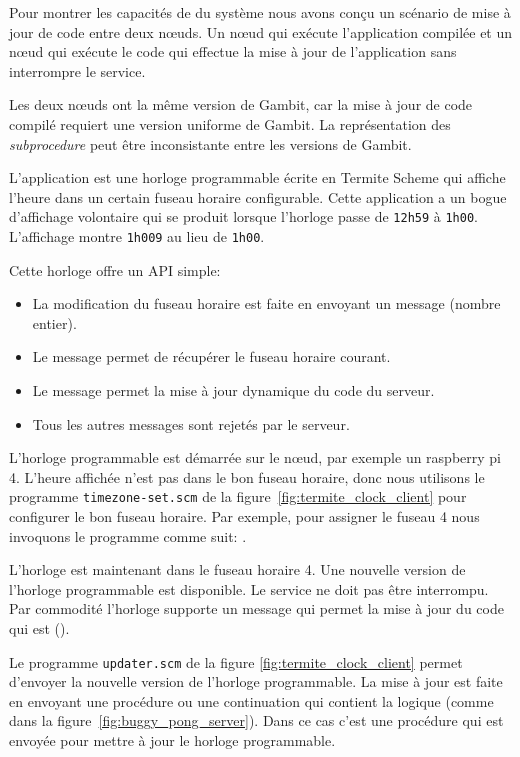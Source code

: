 Pour montrer les capacités de du système nous avons conçu un scénario de mise à
jour de code entre deux nœuds. Un nœud qui exécute l'application compilée et un
nœud qui exécute le code qui effectue la mise à jour de l'application sans
interrompre le service.

Les deux nœuds ont la même version de Gambit, car la mise à jour de code
compilé requiert une version uniforme de Gambit. La représentation des
\textit{subprocedure} peut être inconsistante entre les versions de Gambit.

L'application est une horloge programmable écrite en Termite Scheme qui affiche
l'heure dans un certain fuseau horaire configurable. Cette application a un bogue
d'affichage volontaire qui se produit lorsque l'horloge passe de {\tt 12h59} à
{\tt 1h00}. L'affichage montre {\tt 1h009} au lieu de {\tt 1h00}.

Cette horloge offre un API simple:
\begin{itemize}
  \item La modification du fuseau horaire est faite en envoyant
    un message (nombre entier).

  \item Le message  permet de récupérer
    le fuseau horaire courant.

  \item Le message  permet la mise à jour
    dynamique du code du serveur.

  \item Tous les autres messages sont rejetés par le serveur.
\end{itemize}

L'horloge programmable est démarrée sur le nœud, par exemple un raspberry pi 4.
L'heure affichée n'est pas dans le bon fuseau horaire, donc nous utilisons
le programme \texttt{timezone-set.scm} de la figure~\ref{fig:termite_clock_client}
pour configurer le bon fuseau horaire. Par exemple, pour assigner le fuseau 4
nous invoquons le programme comme suit: .

L'horloge est maintenant dans le fuseau horaire 4. Une nouvelle version de
l'horloge programmable est disponible. Le service ne doit pas être interrompu.
Par commodité l'horloge supporte un message qui permet la mise à jour
du code qui est ().

Le programme \texttt{updater.scm} de la figure \ref{fig:termite_clock_client}
permet d'envoyer la nouvelle version de l'horloge programmable. La mise à jour
est faite en envoyant une procédure ou une continuation qui contient la logique
(comme dans la figure~\ref{fig:buggy_pong_server}). Dans ce cas c'est une procédure qui est envoyée
pour mettre à jour le horloge programmable.

